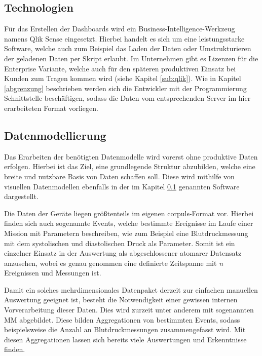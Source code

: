 
\subsection{Technologien}\label{tech}
Für das Erstellen der Dashboards wird ein Business-Intelligence-Werkzeug namens \glqq Qlik Sense\grqq{} eingesetzt.
Hierbei handelt es sich um eine leistungsstarke Software, welche auch zum Beispiel das Laden der Daten oder Umstrukturieren der geladenen Daten per Skript erlaubt.
Im Unternehmen gibt es Lizenzen für die Enterprise Variante, welche auch für den späteren produktiven Einsatz bei Kunden zum Tragen kommen wird (siehe Kapitel \ref{sub:qlik}).
Wie in Kapitel \ref{abgrenzung} beschrieben werden sich die Entwickler mit der Programmierung Schnittstelle beschäftigen, sodass die Daten vom entsprechenden Server im hier erarbeiteten Format vorliegen.

\subsection{Datenmodellierung}
Das Erarbeiten der benötigten Datenmodelle wird vorerst ohne produktive Daten erfolgen.
Hierbei ist das Ziel, eine grundlegende Struktur abzubilden, welche eine breite und nutzbare Basis von Daten schaffen soll.
Diese wird mithilfe von visuellen Datenmodellen ebenfalls in der im Kapitel \ref{tech} genannten
Software dargestellt.

Die Daten der Geräte liegen größtenteils im eigenen \glqq corpuls\grqq{}-Format vor. 
Hierbei finden sich auch sogenannte \glqq Events\grqq{}, welche bestimmte Ereignisse im Laufe einer Mission mit Parametern beschreiben, wie zum Beispiel eine Blutdruckmessung mit dem systolischen und diastolischen Druck als Parameter.
Somit ist ein einzelner Einsatz in der Auswertung als abgeschlossener atomarer Datensatz anzusehen, wobei es genau genommen eine definierte Zeitspanne mit \textit{n} Ereignissen und Messungen ist. 

Damit ein solches mehrdimensionales Datenpaket derzeit zur einfachen manuellen Auswertung geeignet ist, besteht die Notwendigkeit einer gewissen internen Vorverarbeitung dieser Daten.
Dies wird zurzeit unter anderem mit sogenannten \glqq \gls{MM} \grqq{} abgebildet.
Diese bilden Aggregationen von bestimmten Events, sodass beispielsweise die Anzahl an Blutdruckmessungen zusammengefasst wird. 
Mit diesen Aggregationen lassen sich bereits viele Auswertungen und Erkenntnisse finden.

